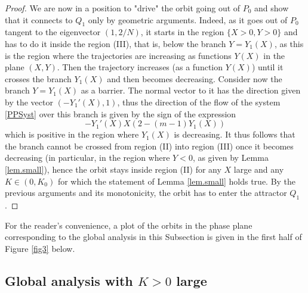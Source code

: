 \documentclass[a4paper,11pt]{article}
\numberwithin{equation}{section}
\begin{document}
\begin{proof}
We are now in a position to "drive" the orbit going out of $P_0$ and show that it connects to $Q_1$ only by geometric arguments. Indeed, as it goes out of $P_0$ tangent to the eigenvector $(1,2/N)$, it starts in the region $\{X>0,Y>0\}$ and has to do it inside the region (III), that is, below the branch $Y=Y_1(X)$, as this is the region where the trajectories are increasing as functions $Y(X)$ in the plane $(X,Y)$. Then the trajectory increases (as a function $Y(X)$) until it crosses the branch $Y_1(X)$ and then becomes decreasing. Consider now the branch $Y=Y_1(X)$ as a barrier. The normal vector to it has the direction given by the vector $(-Y_1'(X),1)$, thus the direction of the flow of the system \eqref{PPSyst} over this branch is given by the sign of the expression
$$
-Y_1'(X)X(2-(m-1)Y_1(X))
$$
which is positive in the region where $Y_1(X)$ is decreasing. It thus follows that the branch cannot be crossed from region (II) into region (III) once it becomes decreasing (in particular, in the region where $Y<0$, as given by Lemma \ref{lem.small}), hence the orbit stays inside region (II) for any $X$ large and any $K\in(0,K_0)$ for which the statement of Lemma \ref{lem.small} holds true. By the previous arguments and its monotonicity, the orbit has to enter the attractor $Q_1$.
\end{proof}
For the reader's convenience, a plot of the orbits in the phase plane corresponding to the global analysis in this Subsection is given in the first half of Figure \ref{fig3} below.

\subsection{Global analysis with $K>0$ large}\label{subsec.large}
\end{document}
